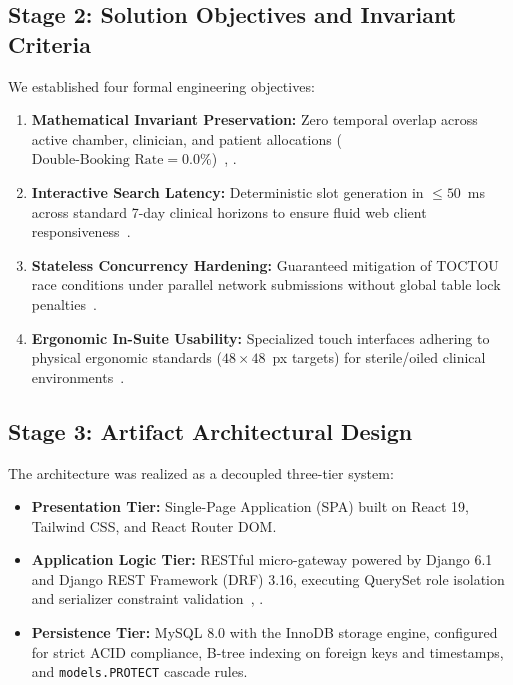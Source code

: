 \documentclass[conference]{IEEEtran}
\begin{document}
\subsection{Stage 2: Solution Objectives and Invariant Criteria}
We established four formal engineering objectives:
\begin{enumerate}
    \item \textbf{Mathematical Invariant Preservation:} Zero temporal overlap across active chamber, clinician, and patient allocations ($\text{Double-Booking Rate} = 0.0\%$)~\cite{bishop1996checking}, \cite{allen1983maintaining}.
    \item \textbf{Interactive Search Latency:} Deterministic slot generation in $\le 50$~ms across standard 7-day clinical horizons to ensure fluid web client responsiveness~\cite{fielding2000architectural}.
    \item \textbf{Stateless Concurrency Hardening:} Guaranteed mitigation of TOCTOU race conditions under parallel network submissions without global table lock penalties~\cite{panda2022concurrency}.
    \item \textbf{Ergonomic In-Suite Usability:} Specialized touch interfaces adhering to physical ergonomic standards ($48 \times 48$~px targets) for sterile/oiled clinical environments~\cite{mamlin2006cooking}.
\end{enumerate}

\subsection{Stage 3: Artifact Architectural Design}
The architecture was realized as a decoupled three-tier system:
\begin{itemize}
    \item \textbf{Presentation Tier:} Single-Page Application (SPA) built on React 19, Tailwind CSS, and React Router DOM.
    \item \textbf{Application Logic Tier:} RESTful micro-gateway powered by Django 6.1 and Django REST Framework (DRF) 3.16, executing QuerySet role isolation and serializer constraint validation~\cite{fielding2000architectural}, \cite{panda2022concurrency}.
    \item \textbf{Persistence Tier:} MySQL 8.0 with the InnoDB storage engine, configured for strict ACID compliance, B-tree indexing on foreign keys and timestamps, and \texttt{models.PROTECT} cascade rules.
\end{itemize}
\end{document}

